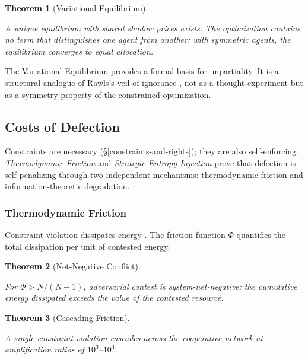 \documentclass[11pt]{article}
\theoremstyle{plain}
\newtheorem{theorem}{Theorem}
\theoremstyle{definition}
\theoremstyle{remark}
\let\origsubsection\subsection
\renewcommand{\subsection}{\needspace{7\baselineskip}\origsubsection}
\let\origsubsubsection\subsubsection
\renewcommand{\subsubsection}{\needspace{4\baselineskip}\origsubsubsection}
\begin{document}
\begin{theorem}[Variational Equilibrium]
\label{ethics-thm-variational-eq}

A unique equilibrium with shared shadow prices exists. The optimization contains no term that distinguishes one agent from another: with symmetric agents, the equilibrium converges to equal allocation. \citep{TC-I}
\end{theorem}

The Variational Equilibrium provides a formal basis for impartiality. It
is a structural analogue of Rawls's veil of ignorance \citep{Rawls1971},
not as a thought experiment but as a symmetry property of the
constrained optimization.

\subsection{Costs of Defection}\label{costs-of-defection}

Constraints are necessary (§\ref{constraints-and-rights}); they are also
self-enforcing. \emph{Thermodynamic Friction} \citep{TC-IV} and
\emph{Strategic Entropy Injection} \citep{TC-II} prove that defection is
self-penalizing through two independent mechanisms: thermodynamic
friction and information-theoretic degradation.

\subsubsection{Thermodynamic Friction}\label{thermodynamic-friction}

Constraint violation dissipates energy \citep{TC-IV}. The friction
function \(\Phi\) quantifies the total dissipation per unit of contested
energy.

\begin{theorem}[Net-Negative Conflict]
\label{ethics-thm-net-negative}

For $\Phi > N/(N-1)$, adversarial contest is system-net-negative: the cumulative energy dissipated exceeds the value of the contested resource. \citep{TC-IV}
\end{theorem}

\begin{theorem}[Cascading Friction]
\label{ethics-thm-cascading-friction}

A single constraint violation cascades across the cooperative network at amplification ratios of $10^3$–$10^4$. \citep{TC-IV}
\end{theorem}
\end{document}
